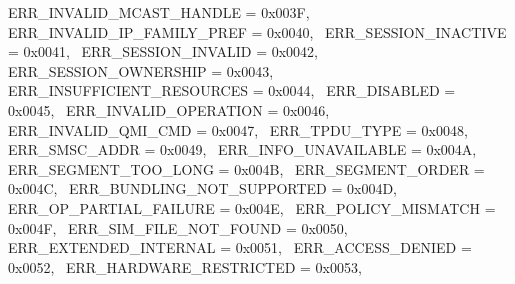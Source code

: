 \begin{DoxyItemize}
 E\+R\+R\+\_\+\+I\+N\+V\+A\+L\+I\+D\+\_\+\+M\+C\+A\+S\+T\+\_\+\+H\+A\+N\+D\+LE = 0x003F,~\newline
 E\+R\+R\+\_\+\+I\+N\+V\+A\+L\+I\+D\+\_\+\+I\+P\+\_\+\+F\+A\+M\+I\+L\+Y\+\_\+\+P\+R\+EF = 0x0040,~\newline
 E\+R\+R\+\_\+\+S\+E\+S\+S\+I\+O\+N\+\_\+\+I\+N\+A\+C\+T\+I\+VE = 0x0041,~\newline
 E\+R\+R\+\_\+\+S\+E\+S\+S\+I\+O\+N\+\_\+\+I\+N\+V\+A\+L\+ID = 0x0042,~\newline
 E\+R\+R\+\_\+\+S\+E\+S\+S\+I\+O\+N\+\_\+\+O\+W\+N\+E\+R\+S\+H\+IP = 0x0043,~\newline
 E\+R\+R\+\_\+\+I\+N\+S\+U\+F\+F\+I\+C\+I\+E\+N\+T\+\_\+\+R\+E\+S\+O\+U\+R\+C\+ES = 0x0044,~\newline
 E\+R\+R\+\_\+\+D\+I\+S\+A\+B\+L\+ED = 0x0045,~\newline
 E\+R\+R\+\_\+\+I\+N\+V\+A\+L\+I\+D\+\_\+\+O\+P\+E\+R\+A\+T\+I\+ON = 0x0046,~\newline
 E\+R\+R\+\_\+\+I\+N\+V\+A\+L\+I\+D\+\_\+\+Q\+M\+I\+\_\+\+C\+MD = 0x0047,~\newline
 E\+R\+R\+\_\+\+T\+P\+D\+U\+\_\+\+T\+Y\+PE = 0x0048,~\newline
 E\+R\+R\+\_\+\+S\+M\+S\+C\+\_\+\+A\+D\+DR = 0x0049,~\newline
 E\+R\+R\+\_\+\+I\+N\+F\+O\+\_\+\+U\+N\+A\+V\+A\+I\+L\+A\+B\+LE = 0x004A,~\newline
 E\+R\+R\+\_\+\+S\+E\+G\+M\+E\+N\+T\+\_\+\+T\+O\+O\+\_\+\+L\+O\+NG = 0x004B,~\newline
 E\+R\+R\+\_\+\+S\+E\+G\+M\+E\+N\+T\+\_\+\+O\+R\+D\+ER = 0x004C,~\newline
 E\+R\+R\+\_\+\+B\+U\+N\+D\+L\+I\+N\+G\+\_\+\+N\+O\+T\+\_\+\+S\+U\+P\+P\+O\+R\+T\+ED = 0x004D,~\newline
 E\+R\+R\+\_\+\+O\+P\+\_\+\+P\+A\+R\+T\+I\+A\+L\+\_\+\+F\+A\+I\+L\+U\+RE = 0x004E,~\newline
 E\+R\+R\+\_\+\+P\+O\+L\+I\+C\+Y\+\_\+\+M\+I\+S\+M\+A\+T\+CH = 0x004F,~\newline
 E\+R\+R\+\_\+\+S\+I\+M\+\_\+\+F\+I\+L\+E\+\_\+\+N\+O\+T\+\_\+\+F\+O\+U\+ND = 0x0050,~\newline
 E\+R\+R\+\_\+\+E\+X\+T\+E\+N\+D\+E\+D\+\_\+\+I\+N\+T\+E\+R\+N\+AL = 0x0051,~\newline
 E\+R\+R\+\_\+\+A\+C\+C\+E\+S\+S\+\_\+\+D\+E\+N\+I\+ED = 0x0052,~\newline
 E\+R\+R\+\_\+\+H\+A\+R\+D\+W\+A\+R\+E\+\_\+\+R\+E\+S\+T\+R\+I\+C\+T\+ED = 0x0053,~\newline

\end{DoxyItemize}
